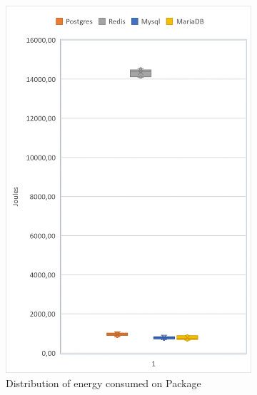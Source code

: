    \begin{figure}[h]
        \centering
        \begin{subfigure}[b]{0.33\textwidth}
            \centering
			\includegraphics[width=1\columnwidth]{results/boxplot/10m/Packgage.png}
			\caption[Distribution of energy consumed on Package]%
            {{\small Distribution of energy consumed on Package}}    
			\label{fig:bocplotyenergyPackage10m}
        \end{subfigure}
        \begin{subfigure}[b]{0.33\textwidth}   
            \centering 

\end{subfigure}
\end{figure}
